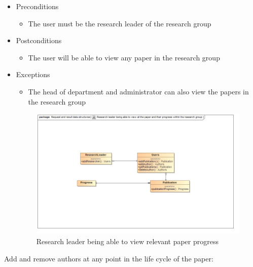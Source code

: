 \documentclass[a4paper,12pt]{article}
\begin{document}
\begin{itemize}
    \item Preconditions
    \begin{itemize}
        \item The user must be the research leader of the research group
    \end{itemize}
    \item Postconditions
    \begin{itemize}
        \item The user will be able to view any paper in the research group
    \end{itemize}
    \item Exceptions
    \begin{itemize}
        \item The head of department and administrator can also view the papers in the research group
    \end{itemize}
    
    \begin{figure}[H]
    \centering
    \caption{Research leader being able to view relevant paper progress}
    \includegraphics[width=1\textwidth]{use-case/research-leader-viewing.png}
    \end{figure}
\end{itemize}
Add and remove authors at any point in the life cycle of the paper:
\end{document}
